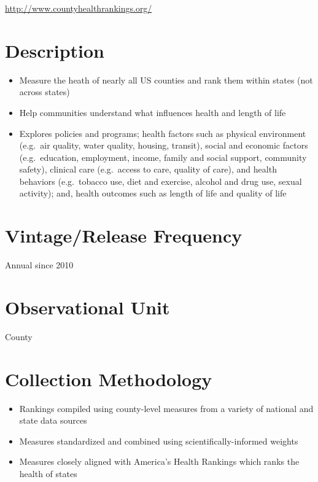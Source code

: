 \documentclass[
]{book}
\providecommand{\tightlist}{%
  \setlength{\itemsep}{0pt}\setlength{\parskip}{0pt}}
\begin{document}
\url{http://www.countyhealthrankings.org/}

\hypertarget{description-20}{%
\section{Description}\label{description-20}}

\begin{itemize}
\tightlist
\item
  Measure the heath of nearly all US counties and rank them within states (not across states)
\item
  Help communities understand what influences health and length of life
\item
  Explores policies and programs; health factors such as physical environment (e.g.~air quality, water quality, housing, transit), social and economic factors (e.g.~education, employment, income, family and social support, community safety), clinical care (e.g.~access to care, quality of care), and health behaviors (e.g.~tobacco use, diet and exercise, alcohol and drug use, sexual activity); and, health outcomes such as length of life and quality of life
\end{itemize}

\hypertarget{vintagerelease-frequency-20}{%
\section{Vintage/Release Frequency}\label{vintagerelease-frequency-20}}

Annual since 2010

\hypertarget{observational-unit-20}{%
\section{Observational Unit}\label{observational-unit-20}}

County

\hypertarget{collection-methodology-20}{%
\section{Collection Methodology}\label{collection-methodology-20}}

\begin{itemize}
\tightlist
\item
  Rankings compiled using county-level measures from a variety of national and state data sources
\item
  Measures standardized and combined using scientifically-informed weights
\item
  Measures closely aligned with America's Health Rankings which ranks the health of states
\end{itemize}
\end{document}
